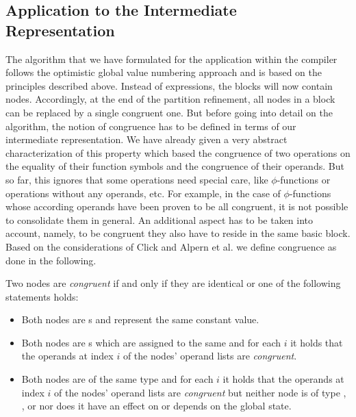 \subsection{Application to the Intermediate Representation}
\label{sec:global-value-numbering:application-to-the-ir}

The algorithm that we have formulated for the application within the compiler follows the optimistic global value numbering approach and is based on the principles described above. Instead of expressions, the blocks will now contain nodes. Accordingly, at the end of the partition refinement, all nodes in a block can be replaced by a single congruent one. But before going into detail on the algorithm, the notion of congruence has to be defined in terms of our intermediate representation. We have already given a very abstract characterization of this property which based the congruence of two operations on the equality of their function symbols and the congruence of their operands. But so far, this ignores that some operations need special care, like $\phi$-functions or operations without any operands, etc. For example, in the case of $\phi$-functions whose according operands have been proven to be all congruent, it is not possible to consolidate them in general. An additional aspect has to be taken into account, namely, to be congruent they also have to reside in the same basic block. Based on the considerations of Click \cite{click:1995:combininganalyses} and Alpern et al. \cite{alpern:1988:detecting-equality-of-variables} we define congruence as done in the following.

\begin{definition}
\label{def:congruent}
Two nodes are \emph{congruent} if and only if they are identical or one of the following statements holds:
\begin{itemize}
\item Both nodes are s and represent the same constant value.
\item Both nodes are s which are assigned to the same  and for each $i$ it holds that the operands at index $i$ of the nodes' operand lists are \emph{congruent}.
\item Both nodes are of the same type and for each $i$ it holds that the operands at index $i$ of the nodes' operand lists are \emph{congruent} but neither node is of type , ,  or  nor does it have an effect on or depends on the global state.
\end{itemize}
\end{definition}

